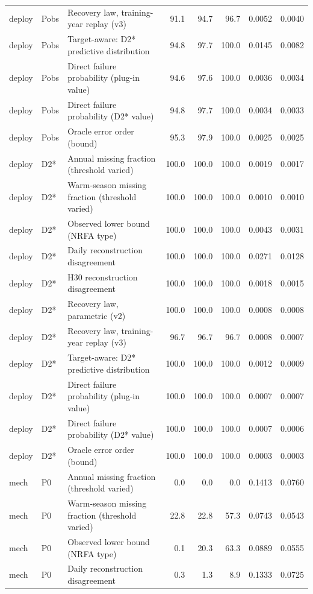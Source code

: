 \begin{table}
{\begin{tabular}{lllrrrrr}
deploy & Pobs & Recovery law, training-year replay (v3) & 91.1 & 94.7 & 96.7 & 0.0052 & 0.0040 \\
deploy & Pobs & Target-aware: D2* predictive distribution & 94.8 & 97.7 & 100.0 & 0.0145 & 0.0082 \\
deploy & Pobs & Direct failure probability (plug-in value) & 94.6 & 97.6 & 100.0 & 0.0036 & 0.0034 \\
deploy & Pobs & Direct failure probability (D2* value) & 94.8 & 97.7 & 100.0 & 0.0034 & 0.0033 \\
deploy & Pobs & Oracle error order (bound) & 95.3 & 97.9 & 100.0 & 0.0025 & 0.0025 \\
deploy & D2* & Annual missing fraction (threshold varied) & 100.0 & 100.0 & 100.0 & 0.0019 & 0.0017 \\
deploy & D2* & Warm-season missing fraction (threshold varied) & 100.0 & 100.0 & 100.0 & 0.0010 & 0.0010 \\
deploy & D2* & Observed lower bound (NRFA type) & 100.0 & 100.0 & 100.0 & 0.0043 & 0.0031 \\
deploy & D2* & Daily reconstruction disagreement & 100.0 & 100.0 & 100.0 & 0.0271 & 0.0128 \\
deploy & D2* & H30 reconstruction disagreement & 100.0 & 100.0 & 100.0 & 0.0018 & 0.0015 \\
deploy & D2* & Recovery law, parametric (v2) & 100.0 & 100.0 & 100.0 & 0.0008 & 0.0008 \\
deploy & D2* & Recovery law, training-year replay (v3) & 96.7 & 96.7 & 96.7 & 0.0008 & 0.0007 \\
deploy & D2* & Target-aware: D2* predictive distribution & 100.0 & 100.0 & 100.0 & 0.0012 & 0.0009 \\
deploy & D2* & Direct failure probability (plug-in value) & 100.0 & 100.0 & 100.0 & 0.0007 & 0.0007 \\
deploy & D2* & Direct failure probability (D2* value) & 100.0 & 100.0 & 100.0 & 0.0007 & 0.0006 \\
deploy & D2* & Oracle error order (bound) & 100.0 & 100.0 & 100.0 & 0.0003 & 0.0003 \\
mech & P0 & Annual missing fraction (threshold varied) & 0.0 & 0.0 & 0.0 & 0.1413 & 0.0760 \\
mech & P0 & Warm-season missing fraction (threshold varied) & 22.8 & 22.8 & 57.3 & 0.0743 & 0.0543 \\
mech & P0 & Observed lower bound (NRFA type) & 0.1 & 20.3 & 63.3 & 0.0889 & 0.0555 \\
mech & P0 & Daily reconstruction disagreement & 0.3 & 1.3 & 8.9 & 0.1333 & 0.0725 \\

\end{tabular}}
\end{table}
